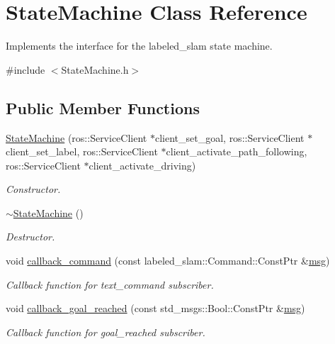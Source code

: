\hypertarget{class_state_machine}{}\section{State\+Machine Class Reference}
\label{class_state_machine}


Implements the interface for the labeled\+\_\+slam state machine.  




{\ttfamily \#include $<$State\+Machine.\+h$>$}

\subsection*{Public Member Functions}
\begin{DoxyCompactItemize}
\item 
\hyperlink{class_state_machine_aa4732b2706c581cb8aac47674b52a8b5}{State\+Machine} (ros\+::\+Service\+Client $\ast$client\+\_\+set\+\_\+goal, ros\+::\+Service\+Client $\ast$client\+\_\+set\+\_\+label, ros\+::\+Service\+Client $\ast$client\+\_\+activate\+\_\+path\+\_\+following, ros\+::\+Service\+Client $\ast$client\+\_\+activate\+\_\+driving)
\begin{DoxyCompactList}\small\item\em Constructor. \end{DoxyCompactList}\item 
\hyperlink{class_state_machine_a93d66cb2a89b186789d655a08b02674e}{$\sim$\+State\+Machine} ()
\begin{DoxyCompactList}\small\item\em Destructor. \end{DoxyCompactList}\item 
void \hyperlink{class_state_machine_a0d90a952683cb15f30bfbaea63ff2e10}{callback\+\_\+command} (const labeled\+\_\+slam\+::\+Command\+::\+Const\+Ptr \&\hyperlink{velocity__forwarder_8cpp_aba2f97176e275688941f5c2a40324b8a}{msg})
\begin{DoxyCompactList}\small\item\em Callback function for text\+\_\+command subscriber. \end{DoxyCompactList}\item 
void \hyperlink{class_state_machine_ae36de4ee8784f1ef63e5721aed3465fc}{callback\+\_\+goal\+\_\+reached} (const std\+\_\+msgs\+::\+Bool\+::\+Const\+Ptr \&\hyperlink{velocity__forwarder_8cpp_aba2f97176e275688941f5c2a40324b8a}{msg})
\begin{DoxyCompactList}\small\item\em Callback function for goal\+\_\+reached subscriber. \end{DoxyCompactList}\end{DoxyCompactItemize}
